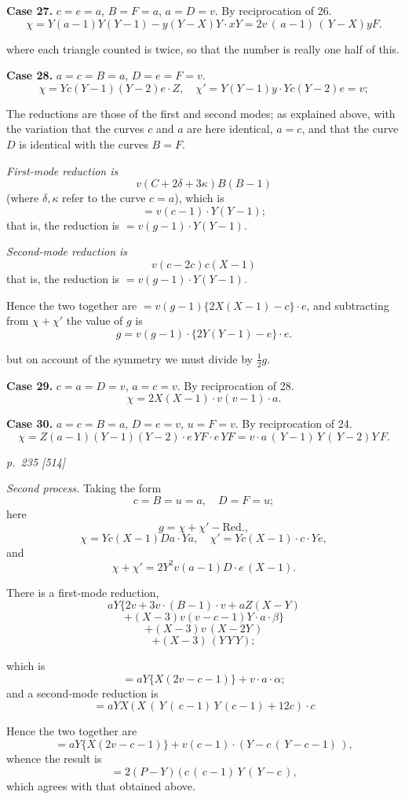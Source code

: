 \documentclass[11pt,a4paper]{book}
\begin{document}
\textbf{Case 27.}  $c=e=a$, $B=F=a$, $a=D=v$.  By reciprocation of 26.
\[
\chi=Y(a-1)Y(Y-1)-y(Y-X)Y\cdot xY=2v\,(\,a-1)\,(\,Y-X)yF.
\]

where each triangle counted is twice, so that the number is really one half of this.

\textbf{Case 28.}  $a=c=B=a$, $D=e=F=v$.
\[
\chi=Yc(Y-1)(Y-2)e\cdot Z, \quad \chi'=Y(Y-1)y\cdot Yc(Y-2)e=v;
\]

The reductions are those of the first and second modes; as explained above, with
the variation that the curves $c$ and $a$ are here identical, $a=c$, and that the curve $D$
is identical with the curves $B=F$.

\textit{First-mode reduction is}
\[
v(C+2\delta+3\kappa)B(B-1)
\]
(where $\delta, \kappa$ refer to the curve $c=a$), which is
\[
=v(c-1)\cdot Y(Y-1);
\]
that is, the reduction is $=v(g-1)\cdot Y(Y-1)$.

\textit{Second-mode reduction is}
\[
v(c-2c)c(X-1)
\]
that is, the reduction is $=v(g-1)\cdot Y(Y-1)$.

Hence the two together are $=v(g-1)\{2X(X-1)-c\}\cdot e$, and subtracting from
$\chi+\chi'$ the value of $g$ is
\[
g=v(g-1)\cdot \{2Y(Y-1)-e\}\cdot e.
\]

but on account of the symmetry we must divide by $\frac{1}{2}g$.

\textbf{Case 29.}  $c=a=D=v$, $a=c=v$.  By reciprocation of 28.
\[
\chi=2X(X-1)\cdot v(v-1)\cdot a.
\]

\textbf{Case 30.}  $a=c=B=a$, $D=e=v$, $u=F=v$.  By reciprocation of 24.
\[
\chi=Z(a-1)(Y-1)(Y-2)\cdot e\,YF\cdot e\,YF=v\cdot a\,(\,Y-1)\,Y\,(\,Y-2)Y\,F.
\]

\clearpage

\bigskip
\textit{p.~235 [514]}
\smallskip

\textit{Second process.}  Taking the form
\[
c=B=u=a, \quad D=F=u;
\]
here
\[
g=\chi+\chi'-\text{Red.},
\]
\[
\chi=Yc(X-1)Da\cdot Ya, \quad \chi'=Yc(X-1)\cdot c\cdot Ye,
\]
and
\[
\chi+\chi'=2Y^2v(a-1)D\cdot e\,(X-1).
\]

There is a first-mode reduction,
\[
aY\{2v+3v\cdot (B-1)\cdot v+aZ(X-Y)
\]
\[
+(X-3)v(v-c-1)Y\cdot a\cdot \beta\}
\]
\[
+(X-3)v\,(X-2Y\,)
\]
\[
+(X-3)\,(Y\,Y\,Y);
\]

which is
\[
=aY\{X(2v-c-1)\}+v\cdot a\cdot \alpha;
\]
and a second-mode reduction is
\[
=aYX\,(\,X\,(\,Y\,(\,c-1)\,Y\,(c-1)+12c)\cdot c
\]

Hence the two together are
\[
=aY\{X(2v-c-1)\}+v(c-1)\cdot (Y-c\,(\,Y-c-1)\,),
\]
whence the result is
\[
=2(P-Y)\,(\,c\,(\,c-1)\,Y\,(\,Y-c\,),
\]
which agrees with that obtained above.
\end{document}
